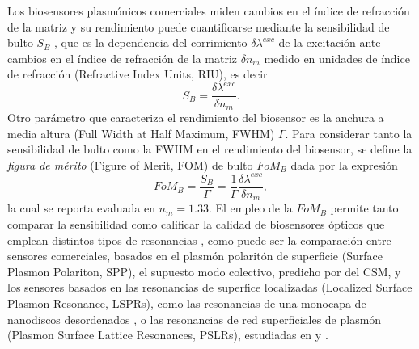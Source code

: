 Los biosensores plasmónicos comerciales miden cambios en el índice de refracción de la matriz y su rendimiento puede cuantificarse mediante la sensibilidad de bulto $S_B$ \cite{estevez2014trends,svedendahl2009refractometric}, que es la dependencia del corrimiento $\delta \lambda^{exc}$ de la excitación ante cambios en el índice de refracción de la matriz $\delta n_m$ medido en unidades de índice de refracción (Refractive Index Units, RIU), es decir
%
	\begin{equation}
	S_B = \frac{\delta \lambda^{exc}}{\delta n_m}.
	\label{eq:SBulk}
	\end{equation}
%
Otro parámetro que caracteriza el rendimiento del biosensor es la anchura a media altura (Full Width at Half Maximum, FWHM) $\Gamma$. Para considerar tanto la sensibilidad de bulto como la FWHM en el rendimiento del biosensor, se define la \emph{figura de mérito} (Figure of Merit, FOM) de bulto  $\textit{FoM}_B$ dada por la expresión
%
	\begin{equation}
	\textit{FoM}_B = \frac{S_B}{\Gamma}
			=\frac{1}{\Gamma}\frac{\delta \lambda^{exc}}{\delta n_m},
	\label{eq:FoM}
	\end{equation}
%
la cual se reporta evaluada en $n_m=1.33$. El empleo de la $\textit{FoM}_B$ permite tanto comparar la sensibilidad como calificar la calidad de biosensores ópticos que emplean distintos tipos de resonancias \cite{danilov2018ultra,svedendahl2009refractometric}, como puede ser la comparación entre sensores comerciales, basados en el plasmón polaritón de superficie (Surface Plasmon Polariton, SPP), el supuesto modo colectivo, predicho por del CSM, y los sensores basados en las resonancias de superfice localizadas (Localized Surface Plasmon Resonance, LSPRs), como las resonancias de una monocapa de nanodiscos desordenados \cite{svedendahl2009refractometric}, o las resonancias de red superficiales de plasmón (Plasmon Surface Lattice Resonances, PSLRs), estudiadas en \cite{kabashin2009plasmonic} y \cite{danilov2018ultra}.

